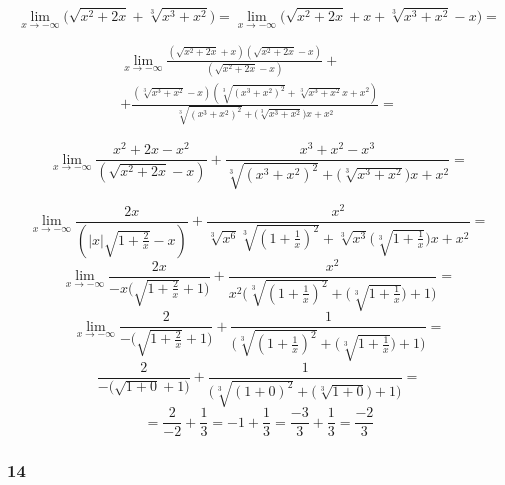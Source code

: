 \documentclass{article}
\begin{document}
\begin{equation*}
    \lim_{x \to - \infty} \Big(\sqrt{x^2 +2x} + \sqrt[3]{x^3 + x^2}\Big) = \lim_{x \to - \infty} \Big(\sqrt{x^2 +2x} + x + \sqrt[3]{x^3 + x^2} - x\Big) = 
\end{equation*}

\begin{multline*}
    \lim_{x \to - \infty} \frac{(\sqrt{x^2 + 2x} + x)(\sqrt{x^2 + 2x} - x)}{(\sqrt{x^2 + 2x} - x)}  + \\ 
     + \frac{(\sqrt[3]{x^3 + x^2} - x)(\sqrt[3]{(x^3 + x^2)^2} + \sqrt[3]{x^3 + x^2}x + x^2)}{\sqrt[3]{(x^3 + x^2)^2} + \Big(\sqrt[3]{x^3 + x^2}\Big)x + x^2} = 
\end{multline*}

\begin{equation*}
    \lim_{x \to - \infty} \frac{x^2 + 2x - x^2}{(\sqrt{x^2 + 2x} - x)}  
     + \frac{x^3 + x^2 - x^3}{\sqrt[3]{(x^3 + x^2)^2} + \Big(\sqrt[3]{x^3 + x^2}\Big)x + x^2} = 
\end{equation*}

\begin{equation*}
    \lim_{x \to - \infty} \frac{2x}{(|x|\sqrt{1 + \frac{2}{x}} - x)} +  \frac{x^2}{\sqrt[3]{x^6} \sqrt[3]{(1 + \frac{1}{x})^2} + \sqrt[3]{x^3}\Big(\sqrt[3]{1 + \frac{1}{x}}\Big)x + x^2} =
\end{equation*}
\begin{equation*}
    \lim_{x \to - \infty} \frac{2x}{-x\Bigg( \sqrt{1 + \frac{2}{x}} + 1 \Bigg)} +  \frac{x^2}{x^{2} \Bigg(\sqrt[3]{(1 + \frac{1}{x})^2} + \Big(\sqrt[3]{1 + \frac{1}{x}}\Big) + 1\Bigg)} =
\end{equation*}
\begin{equation*}
    \lim_{x \to - \infty} \frac{2}{-\Bigg( \sqrt{1 + \frac{2}{x}} + 1 \Bigg)} +  \frac{1}{\Bigg(\sqrt[3]{(1 + \frac{1}{x})^2} + \Big(\sqrt[3]{1 + \frac{1}{x}}\Big) + 1\Bigg)} =
\end{equation*}
\begin{equation*}
    \frac{2}{-\Bigg( \sqrt{1 + 0} + 1 \Bigg)} +  \frac{1}{\Bigg(\sqrt[3]{(1 + 0)^2} + \Big(\sqrt[3]{1 + 0}\Big) + 1\Bigg)} = 
\end{equation*}
\begin{equation*}
    = \frac{2}{-2} + \frac{1}{3} = -1 + \frac{1}{3} = \frac{-3}{3} + \frac{1}{3} = \frac{-2}{3}
\end{equation*}

\subsubsection*{14}
\end{document}
